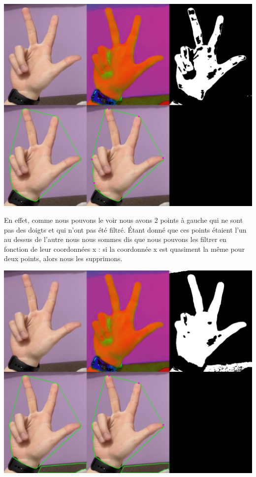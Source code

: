 \documentclass[11pt]{article}
\begin{document}
\begin{center}
    \includegraphics[width=\textwidth]{images/res_3_convex_hull_filter_1_y.png}
    \label{fig:res_3_convex_hull_filter_1_y}
\end{center}

En effet, comme nous pouvons le voir nous avons 2 points à gauche qui ne sont pas des doigts et qui n'ont pas été filtré. \'Etant donné que ces points étaient l'un au dessus de l'autre nous nous sommes dis que nous pouvons les filtrer en fonction de leur coordonnées x : si la coordonnée x est quasiment la même pour deux points, alors nous les supprimons. \bigbreak

\begin{center}
    \includegraphics[width=\textwidth]{images/res_3_convex_hull_filter_1_y_1_x.png}
    \label{fig:res_3_convex_hull_filter_1_y_1_x}
\end{center}
\end{document}
